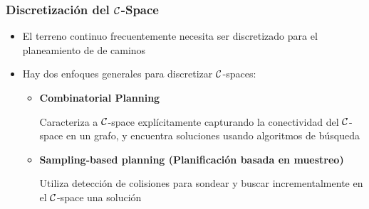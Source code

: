 \begin{frame}
    \frametitle{Discretización del $\mathcal{C}$-Space}
    
    \begin{itemize}
        \item El terreno continuo frecuentemente necesita ser discretizado para el planeamiento de de caminos
        \item Hay dos enfoques generales para discretizar $\mathcal{C}$-spaces:
        \begin{itemize}
            \item \textbf{Combinatorial Planning}
            
            Caracteriza a $\mathcal{C}$-space explícitamente capturando la conectividad del $\mathcal{C}$-space en un grafo, y encuentra soluciones usando algoritmos de búsqueda
            
            \item \textbf{Sampling-based planning (Planificación basada en muestreo)}
            
            Utiliza detección de colisiones para sondear y buscar incrementalmente en el $\mathcal{C}$-space una solución
        \end{itemize}

    \end{itemize}
    
    
    
\end{frame}

